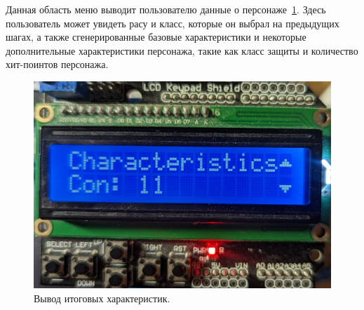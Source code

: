 Данная область меню выводит пользователю данные о персонаже~\ref{fig:output}. Здесь пользователь может увидеть расу и класс, которые он выбрал на предыдущих шагах, а также сгенерированные базовые характеристики и некоторые дополнительные характеристики персонажа, такие как класс защиты и количество хит-поинтов персонажа.

\begin{figure}[H]
    \centering
    \includegraphics[scale=0.15]{output.jpg}
    \caption{Вывод итоговых характеристик.}
    \label{fig:output}
\end{figure}